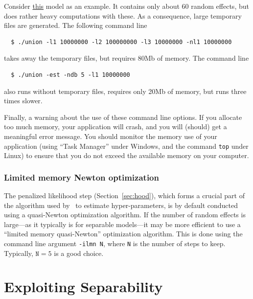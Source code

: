 \documentclass{admbmanual}
\begin{document}
Consider \href{http://otter-rsch.com/admbre/examples/union/union.html}{this}
model as an example. It contains only about 60 random effects, but does rather
heavy computations with these. As a consequence, large temporary files are
generated. The following command line
\begin{lstlisting}
  $ ./union -l1 10000000 -l2 100000000 -l3 10000000 -nl1 10000000
\end{lstlisting}
takes away the temporary files, but requires 80Mb of memory. The command line
\begin{lstlisting}
  $ ./union -est -ndb 5 -l1 10000000
\end{lstlisting}
also runs without temporary files, requires only 20Mb of memory, but runs three
times slower.

Finally, a warning about the use of these command line options. If you allocate
too much memory, your application will crash, and you will (should) get a
meaningful error message. You should monitor the memory use of your application
(using ``Task Manager'' under Windows, and the command \texttt{top} under Linux)
to ensure that you do not exceed the available memory on your computer.

\subsection{Limited memory Newton optimization}

The penalized likelihood step (Section~\ref{sec:hood}), which forms a crucial
part of the algorithm used by \scAB\ to estimate hyper-parameters, is by default
conducted using a quasi-Newton optimization algorithm. If the number of random
effects is large---as it typically is for separable models---it may be more
efficient to use a ``limited memory quasi-Newton'' optimization algorithm. This
is done using the command line argument \texttt{-ilmn N}, where \texttt{N} is
the number of steps to keep. Typically, $\texttt{N} = 5$ is a good choice.

\chapter{Exploiting Separability}
\label{separability}
\end{document}
